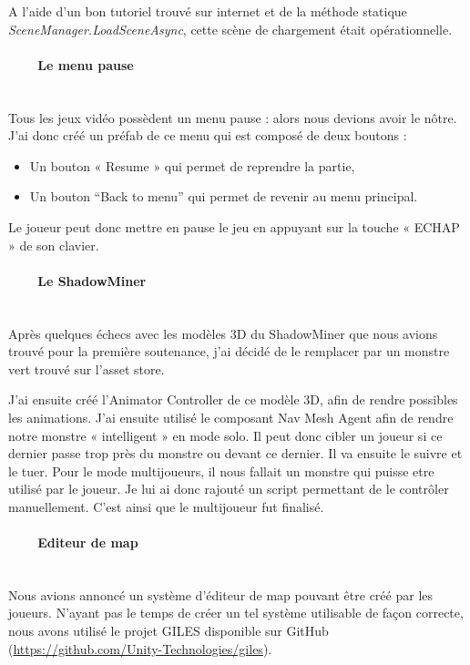 \documentclass[titlepage, 13px, a4paper]{report}
\begin{document}
A l’aide d’un bon tutoriel trouvé sur internet et de la méthode statique \textit{SceneManager.LoadSceneAsync}, cette scène 
de chargement était opérationnelle. \\


\paragraph{~~~~Le menu pause} \hspace{0pt} \\
Tous les jeux vidéo possèdent un menu pause : alors nous devions avoir le nôtre.
J’ai donc créé un préfab de ce menu qui est composé de deux boutons : \\
{\begin{itemize}
	\item Un bouton « Resume » qui permet de reprendre la partie,
	\item Un bouton “Back to menu” qui permet de revenir au menu principal. \\
\end{itemize}}
Le joueur peut donc mettre en pause le jeu en appuyant sur la touche « ECHAP » de son clavier. \\


\paragraph{~~~~Le ShadowMiner} \hspace{0pt} \\
Après quelques échecs avec les modèles 3D du ShadowMiner que nous avions trouvé pour la première soutenance, 
j’ai décidé de le remplacer par un monstre vert trouvé sur l’asset store.

J’ai ensuite créé l’Animator Controller de ce modèle 3D, afin de rendre possibles les animations.
J’ai ensuite utilisé le composant Nav Mesh Agent afin de rendre notre monstre « intelligent » en mode solo.
Il peut donc cibler un joueur si ce dernier passe trop près du monstre ou devant ce dernier. Il va ensuite le suivre et le tuer.
Pour le mode multijoueurs, il nous fallait un monstre qui puisse etre utilisé par le joueur.
Je lui ai donc rajouté un script permettant de le contrôler manuellement.
C’est ainsi que le multijoueur fut finalisé. \\


\paragraph{~~~~Editeur de map} \hspace{0pt} \\
Nous avions annoncé un système d’éditeur de map pouvant être créé par les joueurs.
N’ayant pas le temps de créer un tel système utilisable de façon correcte, nous avons utilisé le projet GILES 
disponible sur GitHub (\url{https://github.com/Unity-Technologies/giles}).
\end{document}
